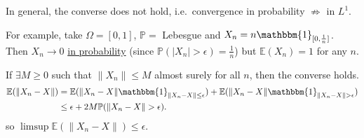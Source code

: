 \documentclass{article}
\newcommand{\1}[1]{\mathbbm{1}_{#1}}
\newcommand{\Prob}{\mathbb{P}}
\newcommand{\E}{\mathbb{E}}
\begin{document}
In general, the converse does not hold, i.e.\ convergence in probability $\not \Rightarrow$ in $L^1$.
\begin{eg}
    For example, take $\Omega = [0,1]$, $\Prob =$ Lebesgue and $X_n = n \1{[0,\frac 1n]}$.
    Then $X_n \to 0$ \hyperlink{def:conv}{in probability} (since $\Prob(|X_n| > \epsilon) = \frac{1}{n}$) but $\mathbb{E}(X_n) = 1$ for any $n$.
\end{eg}

If $\exists M \geq 0$ such that $\|X_n\| \leq M$ almost surely for all $n$, then the converse holds.
\begin{align*}
    \E(\|X_n - X\|) &= \E(\|X_n - X\|\1{\|X_n-X\| \leq \epsilon}) + \E(\|X_n - X\|\1{\|X_n-X\| > \epsilon}) \\
    &\leq \epsilon + 2 M \Prob(\|X_n - X\| > \epsilon).
\end{align*}
so $\limsup \E(\|X_n - X\|) \leq \epsilon$.

\end{document}
